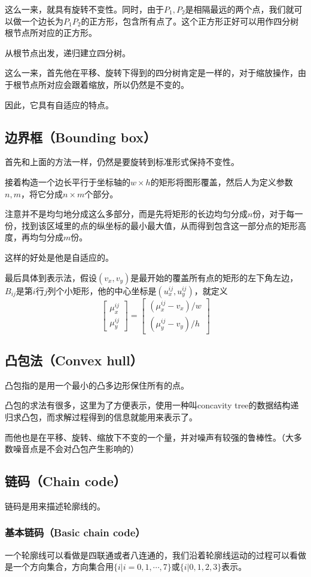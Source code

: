 \documentclass{ctexart}
\begin{document}
这么一来，就具有旋转不变性。同时，由于$P_1,P_2$是相隔最远的两个点，我们就可以做一个边长为$P_1P_2$的正方形，包含所有点了。这个正方形正好可以用作四分树根节点所对应的正方形。

从根节点出发，递归建立四分树。

这么一来，首先他在平移、旋转下得到的四分树肯定是一样的，对于缩放操作，由于根节点所对应会跟着缩放，所以仍然是不变的。

因此，它具有自适应的特点。

\subsection{边界框（Bounding box）}
首先和上面的方法一样，仍然是要旋转到标准形式保持不变性。

接着构造一个边长平行于坐标轴的$w \times h$的矩形将图形覆盖，然后人为定义参数$n,m$，将它分成$n \times m$个部分。

注意并不是均匀地分成这么多部分，而是先将矩形的长边均匀分成$n$份，对于每一份，找到该区域里的点的纵坐标的最小最大值，从而得到包含这一部分点的矩形高度，再均匀分成$m$份。

这样的好处是他是自适应的。

最后具体到表示法，假设$(v_x,v_y)$是最开始的覆盖所有点的矩形的左下角左边，$B_{ij}$是第$i$行$j$列个小矩形，他的中心坐标是$(u_x^{ij},u_y^{ij})$，就定义
\[\begin{bmatrix}\mu_x^{ij} \\ \mu_y^{ij}\end{bmatrix}=\begin{bmatrix}(\mu_x^{ij}-v_x)/w \\ (\mu_y^{ij}-v_y)/h\end{bmatrix}\]
\subsection{凸包法（Convex hull）}
凸包指的是用一个最小的凸多边形保住所有的点。

凸包的求法有很多，这里为了方便表示，使用一种叫concavity tree的数据结构递归求凸包，而求解过程得到的信息就能用来表示了。

而他也是在平移、旋转、缩放下不变的一个量，并对噪声有较强的鲁棒性。（大多数噪音点是不会对凸包产生影响的）
\subsection{链码（Chain code）}
链码是用来描述轮廓线的。
\subsubsection{基本链码（Basic chain code）}
一个轮廓线可以看做是四联通或者八连通的，我们沿着轮廓线运动的过程可以看做是一个方向集合，方向集合用$\{i|i=0,1,\cdots,7\}$或$\{i|0,1,2,3\}$表示。
\end{document}
